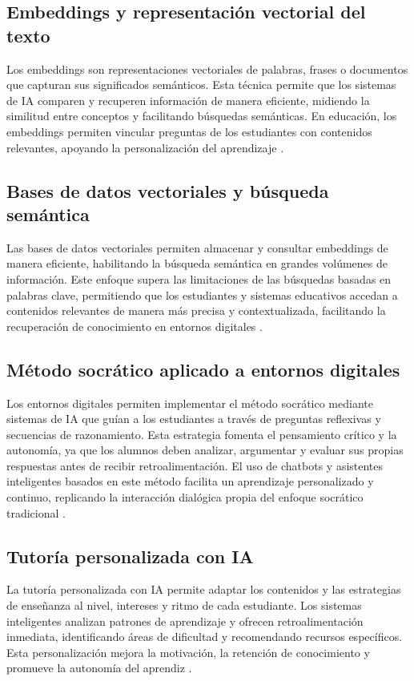 \subsection{Embeddings y representación vectorial del texto}
Los embeddings son representaciones vectoriales de palabras, frases o
documentos que capturan sus significados semánticos. Esta técnica permite que
los sistemas de IA comparen y recuperen información de manera eficiente,
midiendo la similitud entre conceptos y facilitando búsquedas semánticas. En
educación, los embeddings permiten vincular preguntas de los estudiantes con
contenidos relevantes, apoyando la personalización del aprendizaje
\cite{mikolov2013efficient, le2014distributed}.

\subsection{Bases de datos vectoriales y búsqueda semántica}
Las bases de datos vectoriales permiten almacenar y consultar embeddings de
manera eficiente, habilitando la búsqueda semántica en grandes volúmenes de
información. Este enfoque supera las limitaciones de las búsquedas basadas en
palabras clave, permitiendo que los estudiantes y sistemas educativos accedan a
contenidos relevantes de manera más precisa y contextualizada, facilitando la
recuperación de conocimiento en entornos digitales \cite{johnson2019billion,
    bernhard2022vector}.

\subsection{Método socrático aplicado a entornos digitales}
Los entornos digitales permiten implementar el método socrático mediante
sistemas de IA que guían a los estudiantes a través de preguntas reflexivas y
secuencias de razonamiento. Esta estrategia fomenta el pensamiento crítico y la
autonomía, ya que los alumnos deben analizar, argumentar y evaluar sus propias
respuestas antes de recibir retroalimentación. El uso de chatbots y asistentes
inteligentes basados en este método facilita un aprendizaje personalizado y
continuo, replicando la interacción dialógica propia del enfoque socrático
tradicional \cite{graesser2021ai, fox2020socratic}.

\subsection{Tutoría personalizada con IA}
La tutoría personalizada con IA permite adaptar los contenidos y las
estrategias de enseñanza al nivel, intereses y ritmo de cada estudiante. Los
sistemas inteligentes analizan patrones de aprendizaje y ofrecen
retroalimentación inmediata, identificando áreas de dificultad y recomendando
recursos específicos. Esta personalización mejora la motivación, la retención
de conocimiento y promueve la autonomía del aprendiz \cite{woolf2010building,
    duffy2019personalized}.

